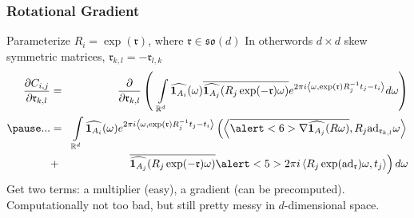 \documentclass{beamer}
\begin{document}
\begin{frame}
\frametitle{Rotational Gradient}
\newcommand{\rr}{\mathfrak{r}}
Parameterize $R_i = \exp( \mathfrak{r} )$, where $\rr \in \mathfrak{so}(d)$ \vskip2pt
\hskip5pt{\small In otherwords $d \times d$ skew symmetric matrices, $\rr_{k,l} = -\rr_{l,k}$}
\pause
\begin{eqnarray*}
\frac{\partial C_{i,j}}{\partial \rr_{k,l}}  
& = &
 \frac{ \partial }{ \partial \rr_{k,l} } \left( \:\: 
	\int \limits_{\R^d} 
		\widehat{\ind{A_i}}(\omega) 
		\overline{\widehat{\ind{A_j}}(R_j \exp(-\rr) \omega)} 
		e^{2 \pi i \inner{\omega}{\exp(\rr) R_j^{-1} t_j - t_i}} 
	d \omega  
\right )\\
\pause
...
& = &
	\int \limits_{\R^d} 
		\widehat{\ind{A_i}}(\omega) e^{2 \pi i \inner{\omega}{\exp(\rr) R_j^{-1} t_j - t_i}} 
		\left(
			\inner{\overline{\alert<6>{\nabla \widehat{\ind{A_j}}(R \omega)}}  }{ R_j \text{ad}_{\rr_{k,l}} \omega } 
		\right. \\
& + & 	\left. 
			\overline{\widehat{\ind{A_j}}(R_j \exp(-\rr) \omega)} 
			\alert<5>{2 \pi i \inner{R_j \exp(\text{ad}_\rr) \omega}{t_j} }
		\right)
	d \omega \\
\end{eqnarray*}
\pause
Get two terms: \pause \alert<5>{a multiplier (easy)}, \pause \alert<6>{a gradient (can be precomputed)}.
\pause
\vskip10pt
Computationally not too bad, but still pretty messy in $d$-dimensional space.
\end{frame}

\end{document}
